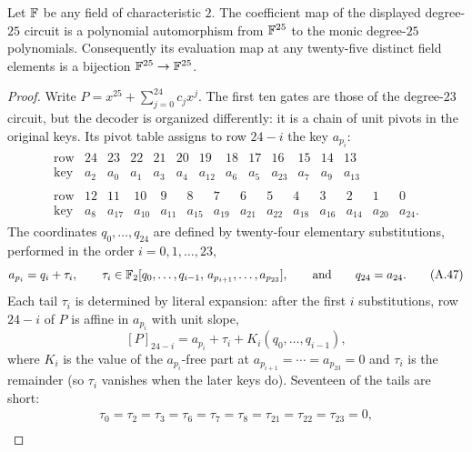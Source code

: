 \begin{lemma}
\label{lem:char2-degree25-inverse}
Let $\mathbb{F}$ be any field of characteristic $2$.  The coefficient map of the
displayed degree-$25$ circuit is a polynomial automorphism from $\mathbb{F}^{25}$ to
the monic degree-$25$ polynomials.  Consequently its evaluation map at any
twenty-five distinct field elements is a bijection $\mathbb{F}^{25}\to\mathbb{F}^{25}$.
\end{lemma}
\begin{proof}
Write $P=x^{25}+\sum_{j=0}^{24}c_jx^j$.  The first ten gates are those of
the degree-$23$ circuit, but the decoder is organized differently: it is a
chain of unit pivots in the original keys.  Its pivot table assigns to row
$24-i$ the key $a_{p_i}$:
\[
\begin{gathered}
\begin{array}{c|rrrrrrrrrrrr}
\text{row}&24&23&22&21&20&19&18&17&16&15&14&13\\ \hline
\text{key}&a_2&a_0&a_1&a_3&a_4&a_{12}&a_6&a_5&a_{23}&a_7&a_9&a_{13}
\end{array}\\[1ex]
\begin{array}{c|rrrrrrrrrrrrr}
\text{row}&12&11&10&9&8&7&6&5&4&3&2&1&0\\ \hline
\text{key}&a_8&a_{17}&a_{10}&a_{11}&a_{15}&a_{19}&a_{21}&a_{22}&a_{18}&a_{16}&a_{14}&a_{20}&a_{24}.
\end{array}
\end{gathered}                                                     \tag{A.46}\label{eq:char2-25-pivot-table}
\]
The coordinates $q_0,\ldots,q_{24}$ are defined by twenty-four elementary
substitutions, performed in the order $i=0,1,\ldots,23$,
\[
 a_{p_i}=q_i+\tau_i,\qquad
 \tau_i\in\mathbb{F}_2[q_0,\ldots,q_{i-1},\,a_{p_{i+1}},\ldots,a_{p_{23}}],
 \qquad\text{and}\qquad q_{24}=a_{24}.                            \tag{A.47}\label{eq:char2-25-chain}
\]
Each tail $\tau_i$ is determined by literal expansion: after the first $i$
substitutions, row $24-i$ of $P$ is affine in $a_{p_i}$ with unit slope,
\[
 [P]_{24-i}=a_{p_i}+\tau_i+K_i(q_0,\ldots,q_{i-1}),                \tag{A.48}\label{eq:char2-25-step}
\]
where $K_i$ is the value of the $a_{p_i}$-free part at
$a_{p_{i+1}}=\cdots=a_{p_{23}}=0$ and $\tau_i$ is the remainder (so
$\tau_i$ vanishes when the later keys do).  Seventeen of the tails are
short:
\[
\begin{gathered}
\tau_0=\tau_2=\tau_3=\tau_6=\tau_7=\tau_8=\tau_{21}=\tau_{22}=\tau_{23}=0,\\

\end{gathered}\]
\end{proof}
